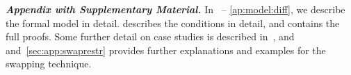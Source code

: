 \noindent
\textbf{\em Appendix with Supplementary Material.}
In~ -- \ref{ap:model:diff}, we describe the formal model in detail.
 describes the conditions in detail, and
 contains the full proofs.
Some further detail on case studies is described
in~, and~
and~\ref{sec:app:swaprestr} provides further
explanations and examples for the swapping technique.




